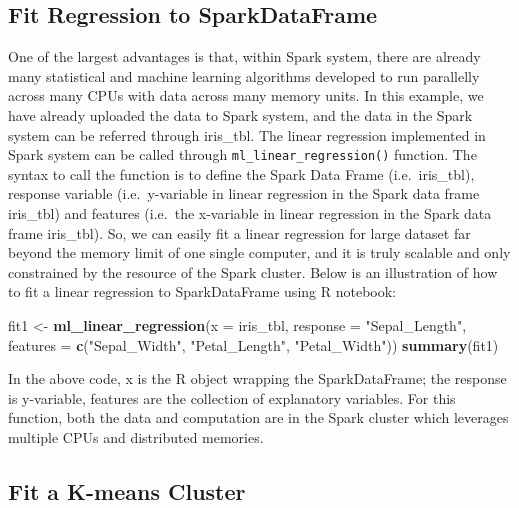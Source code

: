 \documentclass[]{book}
\newenvironment{Shaded}{\begin{snugshade}}{\end{snugshade}}
\newcommand{\KeywordTok}[1]{\textcolor[rgb]{0.13,0.29,0.53}{\textbf{{#1}}}}
\newcommand{\DataTypeTok}[1]{\textcolor[rgb]{0.13,0.29,0.53}{{#1}}}
\newcommand{\StringTok}[1]{\textcolor[rgb]{0.31,0.60,0.02}{{#1}}}
\newcommand{\NormalTok}[1]{{#1}}
\theoremstyle{definition}
\theoremstyle{definition}
\theoremstyle{remark}
\begin{document}
\subsection{Fit Regression to
SparkDataFrame}\label{fit-regression-to-sparkdataframe}

One of the largest advantages is that, within Spark system, there are
already many statistical and machine learning algorithms developed to
run parallelly across many CPUs with data across many memory units. In
this example, we have already uploaded the data to Spark system, and the
data in the Spark system can be referred through iris\_tbl. The linear
regression implemented in Spark system can be called through
\texttt{ml\_linear\_regression()} function. The syntax to call the
function is to define the Spark Data Frame (i.e.~iris\_tbl), response
variable (i.e.~y-variable in linear regression in the Spark data frame
iris\_tbl) and features (i.e.~the x-variable in linear regression in the
Spark data frame iris\_tbl). So, we can easily fit a linear regression
for large dataset far beyond the memory limit of one single computer,
and it is truly scalable and only constrained by the resource of the
Spark cluster. Below is an illustration of how to fit a linear
regression to SparkDataFrame using R notebook:

\begin{Shaded}
\begin{Highlighting}[]
\NormalTok{fit1 <-}\StringTok{  }\KeywordTok{ml_linear_regression}\NormalTok{(}\DataTypeTok{x =} \NormalTok{iris_tbl, }\DataTypeTok{response =} \StringTok{"Sepal_Length"}\NormalTok{, }
                              \DataTypeTok{features =} \KeywordTok{c}\NormalTok{(}\StringTok{"Sepal_Width"}\NormalTok{, }\StringTok{"Petal_Length"}\NormalTok{, }\StringTok{"Petal_Width"}\NormalTok{))}
\KeywordTok{summary}\NormalTok{(fit1)}
\end{Highlighting}
\end{Shaded}

In the above code, x is the R object wrapping the SparkDataFrame; the
response is y-variable, features are the collection of explanatory
variables. For this function, both the data and computation are in the
Spark cluster which leverages multiple CPUs and distributed memories.

\subsection{Fit a K-means Cluster}\label{fit-a-k-means-cluster}
\end{document}
